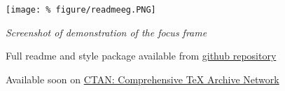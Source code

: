 \documentclass[unknownkeysallowed,usepdftitle=false, parskip=full]{beamer}
\newcommand{\secvariable}{nothing}
\newcommand{\mysection}[1]{\renewcommand{\secvariable}{#1}
}
\begin{document}

\begin{frame}\label{\secvariable}

\centering
\texttt{[image: \%
figure/readmeeg.PNG]}

\tiny{\textit{Screenshot of demonstration of the focus frame}}  

\end{frame}

\mysection{conclusion}
\begin{frame}\label{\secvariable}
  
Full readme and style package available from \href{https://github.com/billyblacklington/focusframe}{github repository}

\vspace{12pt}

Available soon on \href{ctan.org}{CTAN: Comprehensive TeX Archive Network}

  
  
  
\end{frame}
\end{document}
